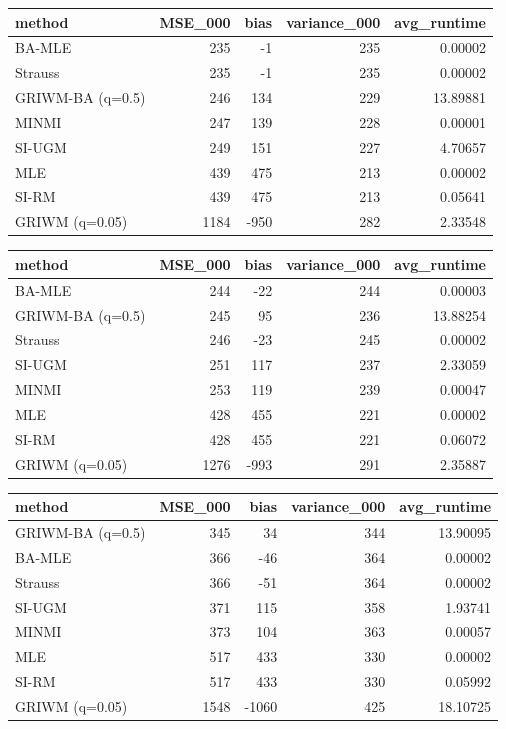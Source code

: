 \documentclass[
]{article}
\begin{document}
\begin{tabular}{l|r|r|r|r}
\hline
method & MSE\_000 & bias & variance\_000 & avg\_runtime\\
\hline
BA-MLE & 235 & -1 & 235 & 0.00002\\
\hline
Strauss & 235 & -1 & 235 & 0.00002\\
\hline
GRIWM-BA (q=0.5) & 246 & 134 & 229 & 13.89881\\
\hline
MINMI & 247 & 139 & 228 & 0.00001\\
\hline
SI-UGM & 249 & 151 & 227 & 4.70657\\
\hline
MLE & 439 & 475 & 213 & 0.00002\\
\hline
SI-RM & 439 & 475 & 213 & 0.05641\\
\hline
GRIWM (q=0.05) & 1184 & -950 & 282 & 2.33548\\
\hline
\end{tabular}

\begin{tabular}{l|r|r|r|r}
\hline
method & MSE\_000 & bias & variance\_000 & avg\_runtime\\
\hline
BA-MLE & 244 & -22 & 244 & 0.00003\\
\hline
GRIWM-BA (q=0.5) & 245 & 95 & 236 & 13.88254\\
\hline
Strauss & 246 & -23 & 245 & 0.00002\\
\hline
SI-UGM & 251 & 117 & 237 & 2.33059\\
\hline
MINMI & 253 & 119 & 239 & 0.00047\\
\hline
MLE & 428 & 455 & 221 & 0.00002\\
\hline
SI-RM & 428 & 455 & 221 & 0.06072\\
\hline
GRIWM (q=0.05) & 1276 & -993 & 291 & 2.35887\\
\hline
\end{tabular}

\begin{tabular}{l|r|r|r|r}
\hline
method & MSE\_000 & bias & variance\_000 & avg\_runtime\\
\hline
GRIWM-BA (q=0.5) & 345 & 34 & 344 & 13.90095\\
\hline
BA-MLE & 366 & -46 & 364 & 0.00002\\
\hline
Strauss & 366 & -51 & 364 & 0.00002\\
\hline
SI-UGM & 371 & 115 & 358 & 1.93741\\
\hline
MINMI & 373 & 104 & 363 & 0.00057\\
\hline
MLE & 517 & 433 & 330 & 0.00002\\
\hline
SI-RM & 517 & 433 & 330 & 0.05992\\
\hline
GRIWM (q=0.05) & 1548 & -1060 & 425 & 18.10725\\
\hline
\end{tabular}
\end{document}
